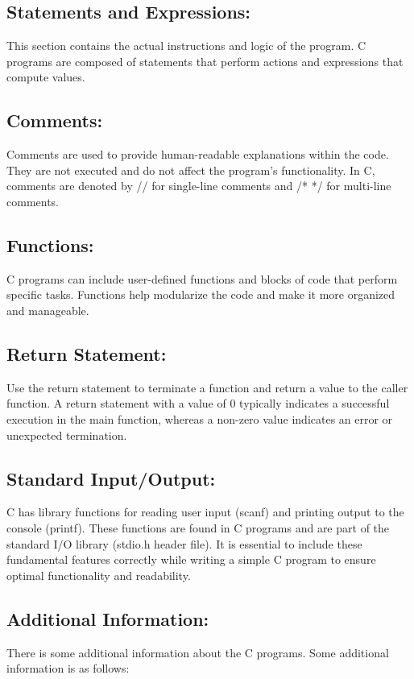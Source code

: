 \documentclass[11pt]{article}
\begin{document}
\subsection{Statements and Expressions:}
This section contains the actual instructions and logic of the program. C programs are composed of statements that perform actions and expressions that compute values.

\subsection{Comments:}
Comments are used to provide human-readable explanations within the code. They are not executed and do not affect the program's functionality. In C, comments are denoted by // for single-line comments and /* */ for multi-line comments.

\subsection{Functions:}
C programs can include user-defined functions and blocks of code that perform specific tasks. Functions help modularize the code and make it more organized and manageable.

\subsection{Return Statement:}
Use the return statement to terminate a function and return a value to the caller function. A return statement with a value of 0 typically indicates a successful execution in the main function, whereas a non-zero value indicates an error or unexpected termination.

\subsection{Standard Input/Output:}
C has library functions for reading user input (scanf) and printing output to the console (printf). These functions are found in C programs and are part of the standard I/O library (stdio.h header file). It is essential to include these fundamental features correctly while writing a simple C program to ensure optimal functionality and readability.

\subsection{Additional Information:}
There is some additional information about the C programs. Some additional information is as follows:
\end{document}
